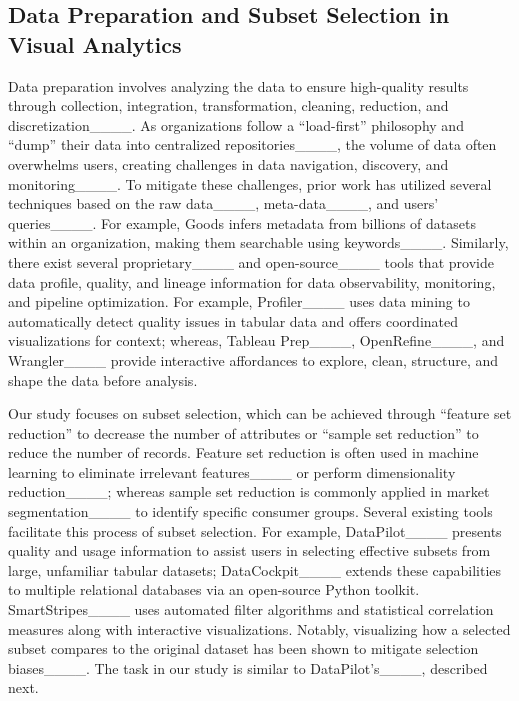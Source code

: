 \subsection{Data Preparation and Subset Selection in Visual Analytics}
Data preparation involves analyzing the data to ensure high-quality results through collection, integration, transformation, cleaning, reduction, and discretization____.
As organizations follow a ``load-first'' philosophy and ``dump'' their data into centralized repositories____, the volume of data often overwhelms users, creating challenges in data navigation, discovery, and monitoring____. 
To mitigate these challenges, prior work has utilized several techniques based on the raw data____, meta-data____, and users' queries____.
For example, Goods infers metadata from billions of datasets within an organization, making them searchable using keywords____.
Similarly, there exist several proprietary____ and open-source____ tools that provide data profile, quality, and lineage information for data observability, monitoring, and pipeline optimization.
For example, 
Profiler____ uses data mining to automatically detect quality issues in tabular data and offers coordinated visualizations for context; whereas, Tableau Prep____, OpenRefine____, and Wrangler____ provide interactive affordances to explore, clean, structure, and shape the data before analysis.

Our study focuses on subset selection\add{____}, which can be achieved through ``feature set reduction'' to decrease the number of attributes or ``sample set reduction'' to reduce the number of records. Feature set reduction is often used in machine learning to eliminate irrelevant features____ or perform dimensionality reduction____; whereas sample set reduction is commonly applied in market segmentation____ to identify specific consumer groups.
Several existing tools facilitate this process of subset selection.
For example, DataPilot____ presents quality and usage information to assist users in selecting effective subsets from large, unfamiliar tabular datasets; 
DataCockpit____ extends these capabilities to multiple relational databases via an open-source Python toolkit.
SmartStripes____ uses automated filter algorithms and statistical correlation measures along with interactive visualizations.
Notably, visualizing how a selected subset compares to the original dataset has been shown to mitigate selection biases____.
The task in our study is similar to DataPilot's____, described next.